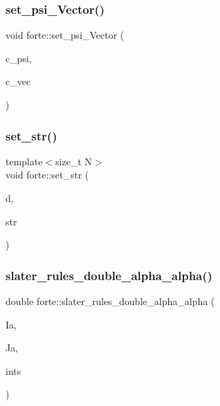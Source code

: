 \mbox{\label{namespaceforte_ae4cd4c8022826599c3dda3710349723a}} 
\subsubsection{\texorpdfstring{set\+\_\+psi\+\_\+\+Vector()}{set\_psi\_Vector()}}
{\footnotesize\ttfamily void forte\+::set\+\_\+psi\+\_\+\+Vector (\begin{DoxyParamCaption}\item[{psi\+::\+Shared\+Vector}]{c\+\_\+psi,  }\item[{const std\+::vector$<$ double $>$ \&}]{c\+\_\+vec }\end{DoxyParamCaption})}

\mbox{\label{namespaceforte_aa628406b6e7b0708538a090f9166cbb1}} 
\subsubsection{\texorpdfstring{set\+\_\+str()}{set\_str()}}
{\footnotesize\ttfamily template$<$size\+\_\+t N$>$ \\
void forte\+::set\+\_\+str (\begin{DoxyParamCaption}\item[{\mbox{\hyperlink{classforte_1_1_determinant_impl}{Determinant\+Impl}}$<$ N $>$ \&}]{d,  }\item[{const std\+::string \&}]{str }\end{DoxyParamCaption})}

\mbox{\label{namespaceforte_ac87709b7860d68506007596e7defdca6}} 
\subsubsection{\texorpdfstring{slater\+\_\+rules\+\_\+double\+\_\+alpha\+\_\+alpha()}{slater\_rules\_double\_alpha\_alpha()}}
{\footnotesize\ttfamily double forte\+::slater\+\_\+rules\+\_\+double\+\_\+alpha\+\_\+alpha (\begin{DoxyParamCaption}\item[{\mbox{\hyperlink{namespaceforte_a840d1bfd3a8b3c16e09979212f37313f}{String}}}]{Ia,  }\item[{\mbox{\hyperlink{namespaceforte_a840d1bfd3a8b3c16e09979212f37313f}{String}}}]{Ja,  }\item[{const std\+::shared\+\_\+ptr$<$ \mbox{\hyperlink{classforte_1_1_active_space_integrals}{Active\+Space\+Integrals}} $>$ \&}]{ints }\end{DoxyParamCaption})}

